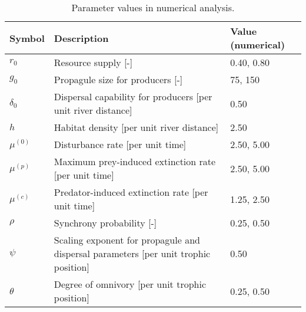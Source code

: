 \begin{table}[ht]
\centering
\caption{Parameter values in numerical analysis.\label{tab:parms-num}} 
\begingroup\small
\begin{tabularx}{\textwidth}{lll}
  \hline
Symbol & Description & Value (numerical) \\ 
  \hline
$r_0$ & Resource supply [-] & 0.40, 0.80 \\ 
  $g_0$ & Propagule size for producers [-] & 75, 150 \\ 
  $\delta_0$ & Dispersal capability for producers [per unit river distance] & 0.50 \\ 
  $h$ & Habitat density [per unit river distance] & 2.50 \\ 
  $\mu^{(0)}$ & Disturbance rate [per unit time] & 2.50, 5.00 \\ 
  $\mu^{(p)}$ & Maximum prey-induced extinction rate [per unit time] & 2.50, 5.00 \\ 
  $\mu^{(c)}$ & Predator-induced extinction rate [per unit time] & 1.25, 2.50 \\ 
  $\rho$ & Synchrony probability [-] & 0.25, 0.50 \\ 
  $\psi$ & Scaling exponent for propagule and dispersal parameters [per unit trophic position] & 0.50 \\ 
  $\theta$ & Degree of omnivory [per unit trophic position] & 0.25, 0.50 \\ 
   \hline
\end{tabularx}
\endgroup
\end{table}
